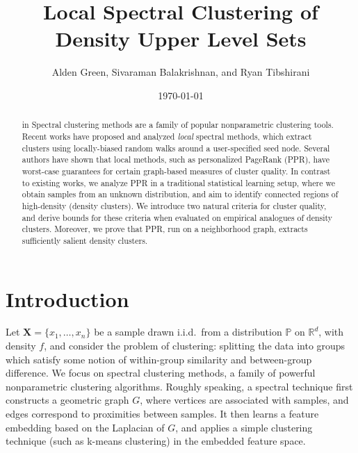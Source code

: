 \documentclass{article}
\newcommand{\Reals}{\mathbb{R}}
\newcommand{\Rd}{\Reals^d}
\newcommand{\1}{\mathbf{1}}
\newcommand{\Pbb}{\mathbb{P}}
\theoremstyle{aldenthm}
\theoremstyle{aldenrmrk}
\begin{document}
\title{Local Spectral Clustering of Density Upper Level Sets}
\author{Alden Green, Sivaraman Balakrishnan, and Ryan Tibshirani}
\date{\today}
\maketitle

\begin{abstract}
 in %
Spectral clustering methods are a family of popular nonparametric clustering
tools.  Recent works have proposed and analyzed \emph{local} spectral methods,
which extract clusters using locally-biased random walks around a user-specified
seed node.  Several authors have shown that local methods, such as personalized
PageRank (PPR), have worst-case guarantees for certain graph-based measures of
cluster quality.  In contrast to existing works, we analyze PPR in a traditional
statistical learning setup, where we obtain samples from an unknown
distribution, and aim to identify connected regions of high-density (density
clusters).  We introduce two natural criteria for cluster quality, and derive
bounds for these criteria when evaluated on empirical analogues of density
clusters. Moreover, we prove that PPR, run on a neighborhood graph, extracts
sufficiently salient density clusters.
\end{abstract}

\section{Introduction}
\label{sec: introduction}

Let $\mathbf{X} = \{x_1, \ldots, x_n\}$ be a sample drawn i.i.d.\ from a
distribution $\Pbb$ on $\Rd$, with density $f$, and consider the problem of 
clustering: splitting the data into groups which satisfy some notion of
within-group similarity and between-group difference.  We focus on spectral
clustering methods, a family of powerful nonparametric clustering algorithms.
Roughly speaking, a spectral technique first constructs a geometric graph $G$,
where vertices are associated with samples, and edges correspond to proximities
between samples. It then learns a feature embedding based on the Laplacian of
$G$, and applies a simple clustering technique (such as k-means clustering) in
the embedded feature space.
\end{document}
